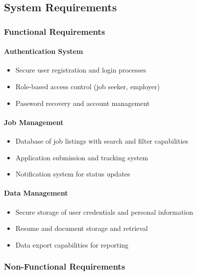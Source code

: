 \documentclass[12pt,a4paper]{article}
\begin{document}
\subsection{System Requirements}

\subsubsection{Functional Requirements}

\paragraph{Authentication System}
\begin{itemize}
    \item Secure user registration and login processes
    \item Role-based access control (job seeker, employer)
    \item Password recovery and account management
\end{itemize}

\paragraph{Job Management}
\begin{itemize}
    \item Database of job listings with search and filter capabilities
    \item Application submission and tracking system
    \item Notification system for status updates
\end{itemize}

\paragraph{Data Management}
\begin{itemize}
    \item Secure storage of user credentials and personal information
    \item Resume and document storage and retrieval
    \item Data export capabilities for reporting
\end{itemize}

\subsubsection{Non-Functional Requirements}
\end{document}
